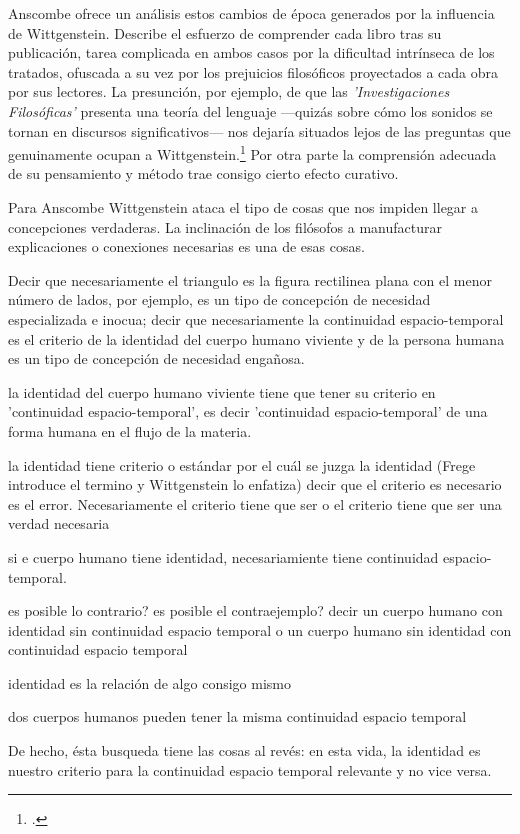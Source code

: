 Anscombe ofrece un análisis estos cambios de época generados por la influencia
de Wittgenstein. Describe el esfuerzo de comprender cada libro tras su
publicación, tarea complicada en ambos casos por la dificultad intrínseca de los
tratados, ofuscada a su vez por los prejuicios filosóficos proyectados a cada
obra por sus lectores. La presunción, por ejemplo, de que las
\emph{'Investigaciones Filosóficas'} presenta una teoría del lenguaje ---quizás
sobre cómo los sonidos se tornan en discursos significativos--- nos dejaría
situados lejos de las preguntas que genuinamente ocupan a
Wittgenstein.\footcite[cf.~][p.~183]{twocuts} Por otra parte la comprensión
adecuada de su pensamiento y método trae consigo cierto efecto curativo.

Para Anscombe Wittgenstein ataca el tipo de cosas que nos impiden llegar a
concepciones verdaderas. La inclinación de los filósofos a manufacturar
explicaciones o conexiones necesarias es una de esas cosas.


Decir que necesariamente el triangulo es la figura rectilinea plana con el menor
número de lados, por ejemplo, es un tipo de concepción de necesidad
especializada e inocua; decir que necesariamente la continuidad espacio-temporal
es el criterio de la identidad del cuerpo humano viviente y de la persona humana
es un tipo de concepción de necesidad engañosa.

la identidad del cuerpo humano viviente tiene que tener su criterio en
'continuidad espacio-temporal', es decir 'continuidad espacio-temporal' de una
forma humana en el flujo de la materia.

la identidad tiene criterio o estándar por el cuál se juzga la identidad (Frege
introduce el termino y Wittgenstein lo enfatiza) decir que el criterio es
necesario es el error. Necesariamente el criterio tiene que ser o el criterio
tiene que ser una verdad necesaria

si e cuerpo humano tiene identidad, necesariamiente tiene continuidad
espacio-temporal.

es posible lo contrario? es posible el contraejemplo? decir un cuerpo humano con
identidad sin continuidad espacio temporal o un cuerpo humano sin identidad con
continuidad espacio temporal

identidad es la relación de algo consigo mismo

dos cuerpos humanos pueden tener la misma continuidad espacio temporal


De hecho, ésta busqueda tiene las cosas al revés: en esta vida, la identidad es
nuestro criterio para la continuidad espacio temporal relevante y no vice versa.

